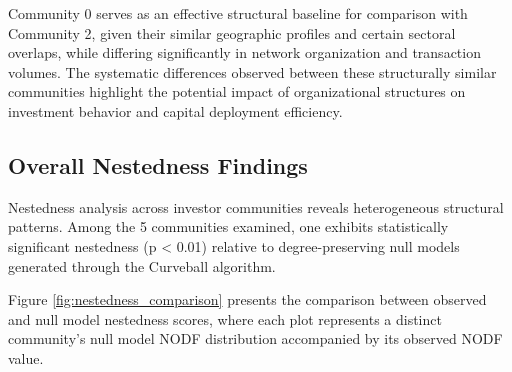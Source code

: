 Community 0 serves as an effective structural baseline for comparison with Community 2, given their similar geographic profiles and certain sectoral overlaps, while differing significantly in network organization and transaction volumes. The systematic differences observed between these structurally similar communities highlight the potential impact of organizational structures on investment behavior and capital deployment efficiency.

\subsection{Overall Nestedness Findings}

\newcommand{\numCommAnalysedNestedness}{5}

Nestedness analysis across investor communities reveals heterogeneous structural patterns. Among the \numCommAnalysedNestedness{} communities examined, one exhibits statistically significant nestedness (p < 0.01) relative to degree-preserving null models generated through the Curveball algorithm.

Figure \ref{fig:nestedness_comparison} presents the comparison between observed and null model nestedness scores, where each plot represents a distinct community's null model NODF distribution accompanied by its observed NODF value.

